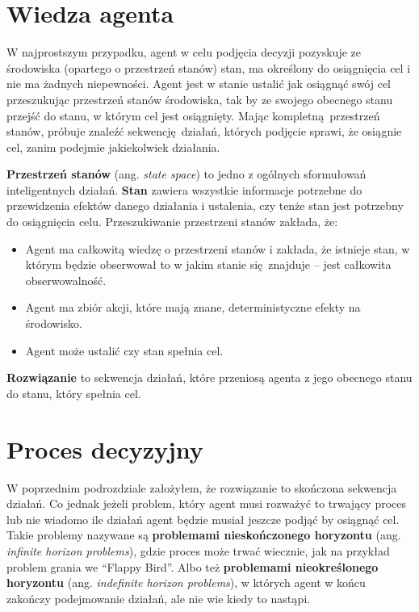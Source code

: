 \documentclass[a4paper, 12pt,twoside]{report}
\begin{document}
\section{Wiedza agenta} 
W najprostszym przypadku, agent w celu podjęcia decyzji pozyskuje ze środowiska
(opartego o przestrzeń stanów) stan, ma określony do osiągnięcia cel i nie ma
żadnych niepewności. Agent jest w stanie ustalić jak osiągnąć swój cel
przeszukując przestrzeń stanów środowiska, tak by ze swojego obecnego stanu
przejść do stanu, w którym cel jest osiągnięty. Mając kompletną przestrzeń
stanów, próbuje znaleźć sekwencję działań, których podjęcie sprawi, że osiągnie
cel, zanim podejmie jakiekolwiek działania.

\textbf{Przestrzeń stanów} (ang. \textit{state space}) to jedno z ogólnych
sformułowań inteligentnych działań. \textbf{Stan} zawiera wszystkie informacje
potrzebne do przewidzenia efektów danego działania i ustalenia, czy tenże stan
jest potrzebny do osiągnięcia celu. Przeszukiwanie przestrzeni stanów zakłada,
że:
\begin{itemize}
	\setlength\itemsep{-0.4em}
\item Agent ma całkowitą wiedzę o przestrzeni stanów i zakłada, że istnieje
	stan, w którym będzie obserwował to w jakim stanie się znajduje --
	jest całkowita obserwowalność.
\item Agent ma zbiór akcji, które mają znane, deterministyczne efekty na
	środowisko.
\item Agent może ustalić czy stan spełnia cel.
\end{itemize}
\textbf{Rozwiązanie} to sekwencja działań, które przeniosą agenta z jego
obecnego stanu do stanu, który spełnia cel.

\section{Proces decyzyjny}
W poprzednim podrozdziale założyłem, że rozwiązanie to skończona sekwencja
działań. Co jednak jeżeli problem, który agent musi rozważyć to trwający
proces lub nie wiadomo ile działań agent będzie musiał jeszcze podjąć by
osiągnąć cel. Takie problemy nazywane
są \textbf{problemami nieskończonego horyzontu} (ang. \textit{infinite horizon
problems}), gdzie proces może trwać wiecznie, jak na przykład problem grania
we ``Flappy Bird''. Albo też \textbf{problemami nieokreślonego horyzontu} (ang.
\textit{indefinite horizon problems}), w których agent w końcu zakończy
podejmowanie działań, ale nie wie kiedy to nastąpi.
\end{document}
